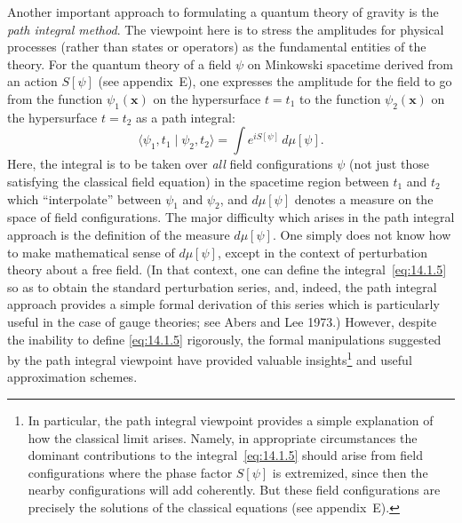 Another important approach to formulating a quantum theory of gravity is the
\emph{path integral method}. The viewpoint here is to stress the amplitudes for physical
processes (rather than states or operators) as the fundamental entities of the theory.
For the quantum theory of a field \(\psi\) on Minkowski spacetime derived from an
action \(S[\psi]\) (see appendix~E), one expresses the amplitude for the field to go from
the function \(\psi_1(\boldsymbol{x})\) on the hypersurface \(t=t_1\) to the function
\(\psi_2(\boldsymbol{x})\) on the hypersurface \(t=t_2\) as a path integral:
\begin{equation}
  \langle\psi_1,t_1\mid\psi_2,t_2\rangle
  =\int e^{iS[\psi]}\,d\mu[\psi].
  \tag{14.1.5}\label{eq:14.1.5}
\end{equation}
Here, the integral is to be taken over \emph{all} field configurations \(\psi\) (not just those
satisfying the classical field equation) in the spacetime region between \(t_1\) and \(t_2\)
which ``interpolate'' between \(\psi_1\) and \(\psi_2\), and \(d\mu[\psi]\) denotes a measure
on the space of field configurations. The major difficulty which arises in the path
integral approach is the definition of the measure \(d\mu[\psi]\). One simply does not know
how to make mathematical sense of \(d\mu[\psi]\), except in the context of perturbation
theory about a free field. (In that context, one can define the integral~\eqref{eq:14.1.5}
so as to obtain the standard perturbation series, and, indeed, the path integral approach
provides a simple formal derivation of this series which is particularly useful in the case
of gauge theories; see Abers and Lee 1973.) However, despite the inability to define
\eqref{eq:14.1.5} rigorously, the formal manipulations suggested by the path integral
viewpoint have provided valuable insights\footnote{In particular, the path integral
viewpoint provides a simple explanation of how the classical limit arises. Namely,
in appropriate circumstances the dominant contributions to the integral~\eqref{eq:14.1.5}
should arise from field configurations where the phase factor \(S[\psi]\) is extremized,
since then the nearby configurations will add coherently. But these field configurations
are precisely the solutions of the classical equations (see appendix~E).} and useful
approximation schemes.

